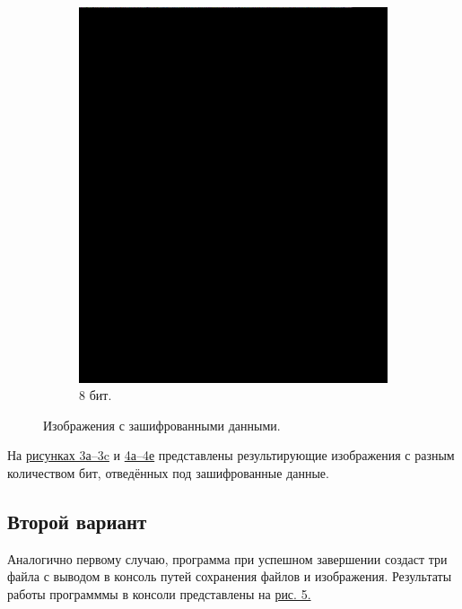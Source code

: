 \documentclass[11pt,a4paper,final]{article} %
\begin{document}
\begin{figure}[h!]
\begin{subfigure}[b]{0.3\linewidth}
		\includegraphics[width=\linewidth]{img/sofya-8-5.png}
		\caption{8 бит.}
		\label{fig:p8}
	\end{subfigure}
	
	\caption{Изображения с зашифрованными данными.}
	\label{fig:encrypted_images_rest}
\end{figure}

\newpage
На \hyperref[fig:encrypted_images_row1]{рисунках 3а--3c} и \hyperref[fig:encrypted_images_rest]{4а--4е} представлены результирующие изображения с разным количеством бит, отведённых под зашифрованные данные.

\subsection{Второй вариант}
Аналогично первому случаю, программа при успешном завершении создаст три файла с выводом в консоль путей сохранения файлов и изображения. Результаты работы программмы в консоли представлены на \hyperref[fig:res2]{рис. 5.}
\end{document}
